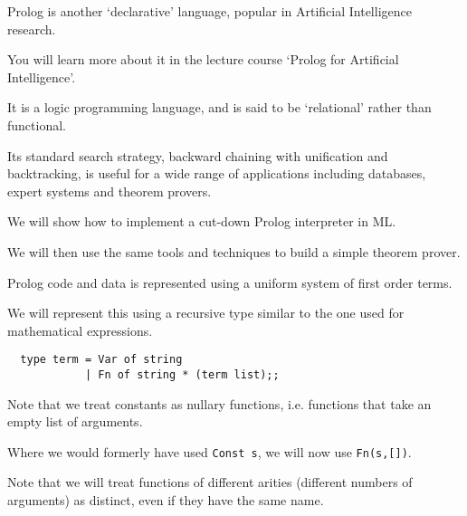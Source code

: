 \begin{slide*}


\vspace*{0.5cm}

Prolog is another `declarative' language, popular in Artificial Intelligence
research.

You will learn more about it in the lecture course `Prolog for Artificial
Intelligence'.

It is a logic programming language, and is said to be `relational' rather than
functional.

Its standard search strategy, backward chaining with unification and
backtracking, is useful for a wide range of applications including databases,
expert systems and theorem provers.

We will show how to implement a cut-down Prolog interpreter in ML.

We will then use the same tools and techniques to build a simple theorem
prover.

\end{slide*}



\begin{slide*}


\vspace*{0.5cm}

Prolog code and data is represented using a uniform system of first order
terms.

We will represent this using a recursive type similar to the one used for
mathematical expressions.

\begin{black}\begin{verbatim}
  type term = Var of string
            | Fn of string * (term list);;
\end{verbatim}\end{black}

Note that we treat constants as nullary functions, i.e. functions that take an
empty list of arguments.

Where we would formerly have used {\black \verb+Const s+}, we will now use
{\black \verb+Fn(s,[])+}.

Note that we will treat functions of different arities (different numbers of
arguments) as distinct, even if they have the same name.

\end{slide*}


